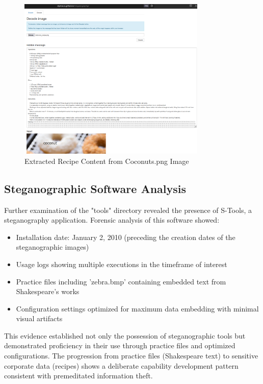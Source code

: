 \begin{figure}[htbp]
    \centering
    \includegraphics[width=0.8\textwidth]{images/Artifact and Evidence Recovery/coconuts_extract.png}
    \caption{Extracted Recipe Content from Coconuts.png Image}
    \label{fig:coconuts_recipe}
\end{figure}

\subsection{Steganographic Software Analysis}
Further examination of the "tools" directory revealed the presence of S-Tools, a steganography application. Forensic analysis of this software showed:

\begin{itemize}
    \item Installation date: January 2, 2010 (preceding the creation dates of the steganographic images)
    \item Usage logs showing multiple executions in the timeframe of interest
    \item Practice files including 'zebra.bmp' containing embedded text from Shakespeare's works
    \item Configuration settings optimized for maximum data embedding with minimal visual artifacts
\end{itemize}

This evidence established not only the possession of steganographic tools but demonstrated proficiency in their use through practice files and optimized configurations. The progression from practice files (Shakespeare text) to sensitive corporate data (recipes) shows a deliberate capability development pattern consistent with premeditated information theft.

